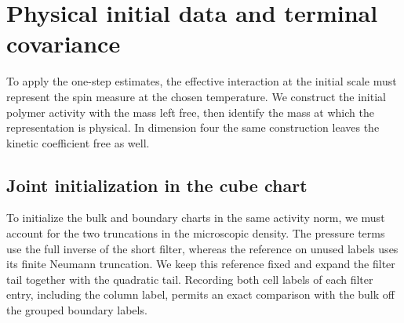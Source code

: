 \documentclass[11pt]{article}
\theoremstyle{definition}
\begin{document}
\section{Physical initial data and terminal covariance}
\label{sec:physical-entry}

To apply the one-step estimates, the effective interaction at the initial
scale must represent the spin measure at the chosen temperature. We
construct the initial polymer activity with the mass left free, then
identify the mass at which the representation is physical. In dimension
four the same construction leaves the kinetic coefficient free as well.

\subsection{Joint initialization in the cube chart}
\label{sec:cube-joint-initialization}

To initialize the bulk and boundary charts in the same activity
norm, we must account for the two truncations in the microscopic
density. The pressure terms use the full inverse of the short
filter, whereas the reference on unused labels uses its finite
Neumann truncation. We keep this reference fixed and expand the
filter tail together with the quadratic tail. Recording both cell
labels of each filter entry, including the column label, permits
an exact comparison with the bulk off the grouped boundary labels.
\end{document}
